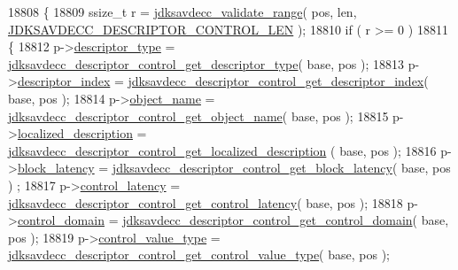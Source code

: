 \begin{DoxyCode}
18808 \{
18809     ssize\_t r = \hyperlink{group__util_ga9c02bdfe76c69163647c3196db7a73a1}{jdksavdecc\_validate\_range}( pos, len, 
      \hyperlink{group__descriptor__control_gae9df372af3485fb181d19f0a820260b1}{JDKSAVDECC\_DESCRIPTOR\_CONTROL\_LEN} );
18810     \textcolor{keywordflow}{if} ( r >= 0 )
18811     \{
18812         p->\hyperlink{structjdksavdecc__descriptor__control_ab7c32b6c7131c13d4ea3b7ee2f09b78d}{descriptor\_type} = 
      \hyperlink{group__descriptor__control_ga747cdb72ec5e1e41fd494f2f31d82c87}{jdksavdecc\_descriptor\_control\_get\_descriptor\_type}( base, 
      pos );
18813         p->\hyperlink{structjdksavdecc__descriptor__control_a042bbc76d835b82d27c1932431ee38d4}{descriptor\_index} = 
      \hyperlink{group__descriptor__control_ga4e472a9d308d354e324cdb8678504b1d}{jdksavdecc\_descriptor\_control\_get\_descriptor\_index}( base,
       pos );
18814         p->\hyperlink{structjdksavdecc__descriptor__control_a7d1f5945a13863b1762fc6db74fa8f80}{object\_name} = 
      \hyperlink{group__descriptor__control_ga8cdcbd043032b466a4734b05276aa14f}{jdksavdecc\_descriptor\_control\_get\_object\_name}( base, pos );
18815         p->\hyperlink{structjdksavdecc__descriptor__control_a0926f846ca65a83ad5bb06b4aff8f408}{localized\_description} = 
      \hyperlink{group__descriptor__control_gac65cfd23f0168aed10f6f0d9b0e5ac71}{jdksavdecc\_descriptor\_control\_get\_localized\_description}
      ( base, pos );
18816         p->\hyperlink{structjdksavdecc__descriptor__control_ae2e9f0088d5e900b610d1b2818dfc559}{block\_latency} = 
      \hyperlink{group__descriptor__control_ga76ad41a544a93c25d3228b85da67e1a7}{jdksavdecc\_descriptor\_control\_get\_block\_latency}( base, pos )
      ;
18817         p->\hyperlink{structjdksavdecc__descriptor__control_ab2bd4639caaf9a8078b68368afbd63b6}{control\_latency} = 
      \hyperlink{group__descriptor__control_gaab96ebb6faa4b5ec2e13c0e816ce99cc}{jdksavdecc\_descriptor\_control\_get\_control\_latency}( base, 
      pos );
18818         p->\hyperlink{structjdksavdecc__descriptor__control_a8937b22996b7c28ae209f29fe777f03a}{control\_domain} = 
      \hyperlink{group__descriptor__control_gacaf61b58bf830f4b1624075f361ecbf5}{jdksavdecc\_descriptor\_control\_get\_control\_domain}( base, pos
       );
18819         p->\hyperlink{structjdksavdecc__descriptor__control_a62a5b88a920cc4d09508de6fc60d9a63}{control\_value\_type} = 
      \hyperlink{group__descriptor__control_ga6f8551ec542edcc8b1f8b3abc8976e33}{jdksavdecc\_descriptor\_control\_get\_control\_value\_type}( 
      base, pos );

\end{DoxyCode}
